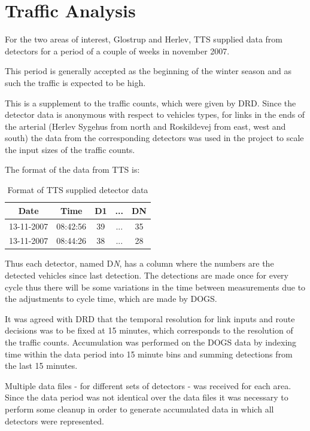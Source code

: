 \section{Traffic Analysis}
\label{data}
For the two areas of interest, Glostrup and Herlev, TTS supplied data from detectors for a period of a couple of weeks in november 2007. 

This period is generally accepted as the beginning of the winter season and as such the traffic is expected to be high.

This is a supplement to the traffic counts, which were given by DRD. Since the detector data is anonymous with respect to vehicles types, for links in the ends of the arterial (Herlev Sygehus from north and Roskildevej from east, west and south) the data from the corresponding detectors was used in the project to scale the input sizes of the traffic counts.

The format of the data from TTS is:

\begin{table}[ht]
\centering
\begin{tabular}{c|c|c|c|c}
\textbf{Date} & \textbf{Time} & \textbf{D1} & \textbf{...} & \textbf{DN} \\ \hline
13-11-2007 & 08:42:56 & 39 & ... & 35 \\
13-11-2007 & 08:44:26 & 38 & ...  & 28 \\
\end{tabular}
\caption{Format of TTS supplied detector data}
\label{tab:dataformat}
\end{table}

Thus each detector, named D\textit{N}, has a column where the numbers are the detected vehicles since last detection. The detections are made once for every cycle thus there will be some variations in the time between measurements due to the adjustments to cycle time, which are made by DOGS.

It was agreed with DRD that the temporal resolution for link inputs and route decisions was to be fixed at 15 minutes, which corresponds to the resolution of the traffic counts. Accumulation was performed on the DOGS data by indexing time within the data period into 15 minute bins and summing detections from the last 15 minutes.

Multiple data files - for different sets of detectors - was received for each area. Since the data period was not identical over the data files it was necessary to perform some cleanup in order to generate accumulated data in which all detectors were represented.

